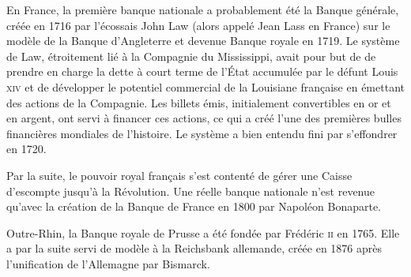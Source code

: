 

En France, la première banque nationale a probablement été la Banque générale, créée en 1716 par l'écossais John Law (alors appelé Jean Lass en France) sur le modèle de la Banque d'Angleterre et devenue Banque royale en 1719. Le système de Law, étroitement lié à la Compagnie du Mississippi, avait pour but de de prendre en charge la dette à court terme de l'État accumulée par le défunt Louis \textsc{xiv} et de développer le potentiel commercial de la Louisiane française en émettant des actions de la Compagnie. Les billets émis, initialement convertibles en or et en argent, ont servi à financer ces actions, ce qui a créé l'une des premières bulles financières mondiales de l'histoire. Le système a bien entendu fini par s'effondrer en 1720.

Par la suite, le pouvoir royal français s'est contenté de gérer une Caisse d'escompte jusqu'à la Révolution. Une réelle banque nationale n'est revenue qu'avec la création de la Banque de France en 1800 par Napoléon Bonaparte.

Outre-Rhin, la Banque royale de Prusse a été fondée par Frédéric \textsc{ii} en 1765. Elle a par la suite servi de modèle à la Reichsbank allemande, créée en 1876 après l'unification de l'Allemagne par Bismarck.

